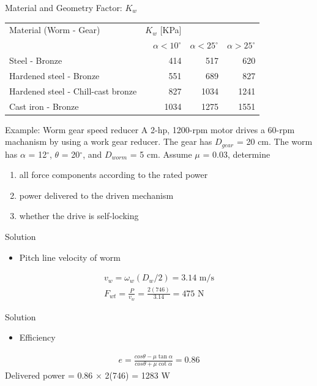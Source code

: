 \documentclass[a4paper,openany]{tufte-book}
\begin{document}
Material and Geometry Factor: \(K_{w}\)

\begin{center}
\begin{tabular}{lrrr}
Material (Worm - Gear) & \(K_{w}\) [KPa] &  & \\
 & \(\alpha < 10^{\circ}\) & \(\alpha < 25^{\circ}\) & \(\alpha > 25^{\circ}\)\\
Steel - Bronze & 414 & 517 & 620\\
Hardened steel - Bronze & 551 & 689 & 827\\
Hardened steel - Chill-cast bronze & 827 & 1034 & 1241\\
Cast iron - Bronze & 1034 & 1275 & 1551\\
\end{tabular}
\end{center}

Example: Worm gear speed reducer A 2-hp, 1200-rpm motor drives a 60-rpm
machanism by using a work gear reducer. The gear has \(D_{gear}\) = 20
cm. The worm has \(\alpha\) = 12\(^{\circ}\), \(\theta\) =
20\(^{\circ}\), and \(D_{worm}\) = 5 cm. Assume \(\mu\) = 0.03,
determine

\begin{enumerate}
\item all force components according to the rated power

\item power delivered to the driven mechanism

\item whether the drive is self-locking
\end{enumerate}

Solution

\begin{itemize}
\item Pitch line velocity of worm
\end{itemize}

\begin{align}
    v_{w} = \omega_{w} (D_{w}/2) = 3.14 \text{ m/s} \\
    F_{wt} = \frac{P}{v_{w}} = \frac{2(746)}{3.14} = 475 \text{ N}
  \end{align}

Solution

\begin{itemize}
\item Efficiency
\end{itemize}

\begin{align}
    e = \frac{cos \theta - \mu \tan \alpha}{cos \theta + \mu \cot \alpha} = 0.86
  \end{align} Delivered power = 0.86 \(\times\) 2(746) = 1283 W
\end{document}
